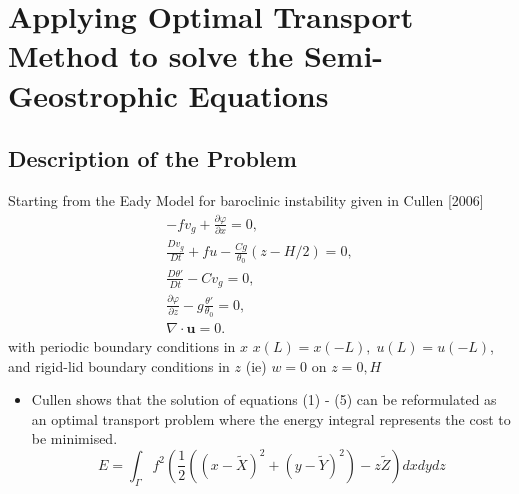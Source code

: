 \documentclass[]{article}
\begin{document}
\section{Applying Optimal Transport Method to solve the Semi-Geostrophic Equations}
	\subsection{Description of the Problem}
	Starting from the Eady Model for baroclinic instability given in Cullen [2006]
	\begin{align}
	-fv_g + \frac{\partial \varphi}{\partial x} = 0,\\
	\frac{Dv_g}{Dt} + fu -\frac{Cg}{\theta _0}\left(z-H/2\right) = 0,\\
	\frac{D\theta'}{Dt} - Cv_g = 0,\\
	\frac{\partial \varphi}{\partial z} - g\frac{\theta'}{\theta_0} = 0,\\
	\nabla \cdot \bm{u} = 0.
	\end{align}
	with periodic boundary conditions in $x$ \color{red} $x(L) = x(-L), \; u(L) = u(-L)$, \color{black} and rigid-lid boundary conditions in $z$ (ie) $w = 0$ on $z = 0, H$
	\begin{itemize}
		\item Cullen \cite{Cullen2008} shows that the solution of equations (1) - (5) can be reformulated as an optimal transport problem where the energy integral represents the cost to be minimised.
		\begin{equation}
		E = \int_ \Gamma f^2 \left(\frac{1}{2}\left(\left(x - \tilde{X}\right)^2 +\left(y - \tilde{Y}\right)^2\right) - z\tilde{Z}\right)dxdydz
		\end{equation}
	\end{itemize}
\end{document}
